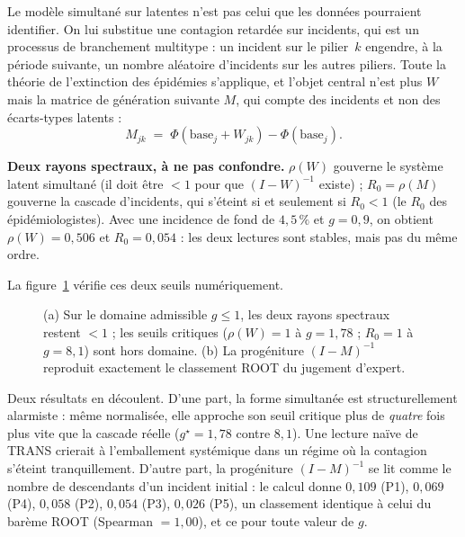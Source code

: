 Le modèle simultané sur latentes n'est pas celui que les données pourraient identifier. On lui
substitue une contagion retardée sur incidents, qui est un processus de
branchement multitype : un incident sur le pilier~$k$ engendre, à la période suivante, un
nombre aléatoire d'incidents sur les autres piliers. Toute la théorie de l'extinction des
épidémies s'applique, et l'objet central n'est plus $W$ mais la matrice de génération
suivante $M$, qui compte des incidents et non des écarts-types latents :
\begin{equation}
M_{jk}\;=\;\Phi(\text{base}_j+W_{jk})-\Phi(\text{base}_j).
\end{equation}

\begin{cle}
\textbf{Deux rayons spectraux, à ne pas confondre.} $\rho(W)$ gouverne le système latent
simultané (il doit être $<1$ pour que $(I-W)^{-1}$ existe) ; $R_0=\rho(M)$ gouverne la cascade
d'incidents, qui s'éteint si et seulement si $R_0<1$ (le $R_0$ des épidémiologistes). Avec une
incidence de fond de $4{,}5\,\%$ et $g=0{,}9$, on obtient $\rho(W)=0{,}506$ et
$R_0=0{,}054$ : les deux lectures sont stables, mais pas du même ordre.
\end{cle}

\noindent La figure~\ref{fig:branchement-R0} vérifie ces deux seuils numériquement.

\begin{figure}[htbp]\centering
{}
\caption{(a) Sur le domaine admissible $g\le1$, les deux rayons spectraux restent $<1$ ; les
seuils critiques ($\rho(W)=1$ à $g=1{,}78$ ; $R_0=1$ à $g=8{,}1$) sont hors domaine. (b) La
progéniture $(I-M)^{-1}$ reproduit exactement le classement ROOT du jugement d'expert.}
\label{fig:branchement-R0}
\end{figure}

Deux résultats en découlent. D'une part, la forme simultanée est structurellement
alarmiste : même normalisée, elle approche son seuil critique plus de \emph{quatre} fois plus
vite que la cascade réelle ($g^\star=1{,}78$ contre $8{,}1$). Une lecture naïve de TRANS crierait à
l'emballement systémique dans un régime où la contagion s'éteint tranquillement. D'autre part,
la progéniture $(I-M)^{-1}$ se lit comme le nombre de descendants d'un incident initial : le
calcul donne $0{,}109$ (P1), $0{,}069$ (P4), $0{,}058$ (P2), $0{,}054$ (P3), $0{,}026$ (P5), un
classement identique à celui du barème ROOT (Spearman $=1{,}00$), et ce pour toute
valeur de $g$.

